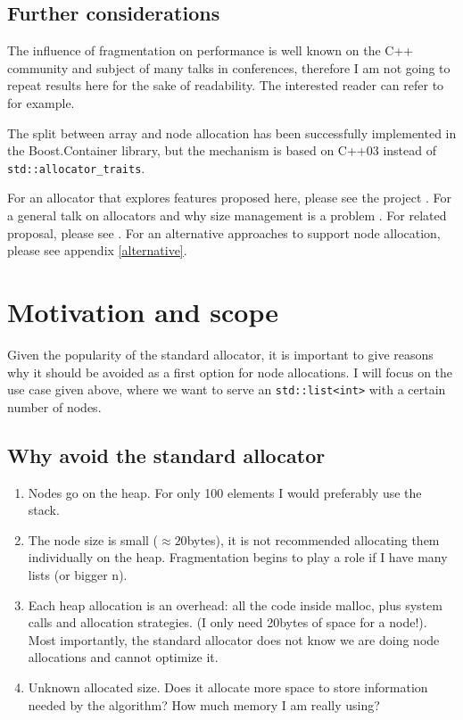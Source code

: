 \documentclass[11pt]{article}
\begin{document}
\subsection{Further considerations}
The influence of fragmentation on performance is well known on the C++
community and subject of many talks in conferences, therefore I am not going to
repeat results here for the sake of readability. The interested reader can
refer to \cite{chandler, meyers} for example.

The split between array and node allocation has been successfully implemented
in the Boost.Container library, but the mechanism is based on C++03 instead of
\texttt{std::allocator\_traits}.

For an allocator that explores features proposed here, please see the
project \cite{rtcpp}. For a general talk on allocators and why size management
is a problem \cite{alexandrescu}. For related proposal, please see
\cite{prop1}.  For an alternative approaches to support node allocation, please
see appendix \ref{alternative}.

\section{Motivation and scope}

Given the popularity of the standard allocator, it is important to give reasons
why it should be avoided as a first option for node allocations. I will focus
on the use case given above, where we want to serve an
\texttt{std::list<int>} with a certain number of nodes.

\subsection{Why avoid the standard allocator}

\begin{enumerate}

\item Nodes go on the heap. For only 100 elements I would preferably
use the stack.

\item The node size is small ($\approx 20$bytes), it is not recommended
allocating them individually on the heap. Fragmentation begins to play a role
if I have many lists (or bigger n).

\item  Each heap allocation is an overhead: all the code inside malloc, plus
system calls and allocation strategies. (I only need 20bytes of space for a
node!). Most importantly, the standard allocator does not
know we are doing node allocations and cannot optimize it.

\item Unknown allocated size. Does it allocate more space to store information
needed by the algorithm? How much memory I am really using?

\end{enumerate}
\end{document}
